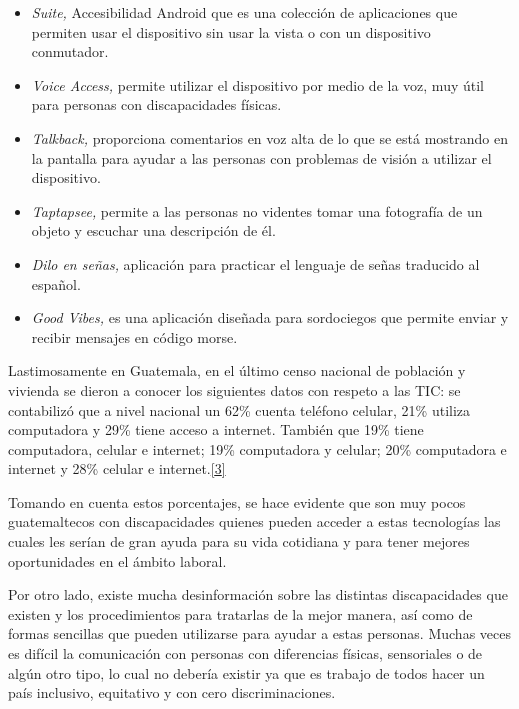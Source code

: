 \documentclass[12pt,spanish,Letterpaper,openany]{book}
\newcommand{\spacefourmilis}{\vspace{4mm}}
\begin{document}
\begin{itemize}
\item
  \emph{Suite,} Accesibilidad Android que es una colección de aplicaciones que permiten usar el dispositivo sin usar la vista o con un dispositivo conmutador.
\item
  \emph{Voice Access,} permite utilizar el dispositivo por medio de la voz, muy útil para personas con discapacidades físicas.
\item
  \emph{Talkback,} proporciona comentarios en voz alta de lo que se está mostrando en la pantalla para ayudar a las personas con problemas de visión a utilizar el dispositivo.
\item
  \emph{Taptapsee,} permite a las personas no videntes tomar una fotografía de un objeto y escuchar una descripción de él.
\item
  \emph{Dilo en señas,} aplicación para practicar el lenguaje de señas traducido al español.
\item
  \emph{Good Vibes,} es una aplicación diseñada para sordociegos que permite enviar y recibir mensajes en código morse.
\end{itemize}

\hypertarget{articulo05_cross03}{}
\spacefourmilis

Lastimosamente en Guatemala, en el último censo nacional de población y vivienda se dieron a conocer los siguientes datos con respeto a las TIC: se contabilizó que a nivel nacional un 62\% cuenta teléfono celular, 21\% utiliza computadora y 29\% tiene acceso a internet. También que 19\% tiene computadora, celular e internet; 19\% computadora y celular; 20\% computadora e internet y 28\% celular e internet.\protect\hyperlink{articulo05_ref03}{{[}3{]}}

Tomando en cuenta estos porcentajes, se hace evidente que son muy pocos guatemaltecos con discapacidades quienes pueden acceder a estas tecnologías las cuales les serían de gran ayuda para su vida cotidiana y para tener mejores oportunidades en el ámbito laboral.

Por otro lado, existe mucha desinformación sobre las distintas discapacidades que existen y los procedimientos para tratarlas de la mejor manera, así como de formas sencillas que pueden utilizarse para ayudar a estas personas. Muchas veces es difícil la comunicación con personas con diferencias físicas, sensoriales o de algún otro tipo, lo cual no debería existir ya que es trabajo de todos hacer un país inclusivo, equitativo y con cero discriminaciones.
\end{document}
